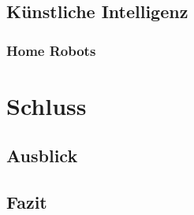 \documentclass[a4paper]{article}
\begin{document}
\subsection{Künstliche Intelligenz}
\label{sub:kuenstliche_intelligenz}

\subsubsection{Home Robots}
\label{sub:home_robots}

\section{Schluss}
\label{sec:schluss}

\subsection{Ausblick}
\label{sub:ausblick}

\subsection{Fazit}
\label{sub:fazit}


\newpage


\printbibliography

%

%
\end{document}
